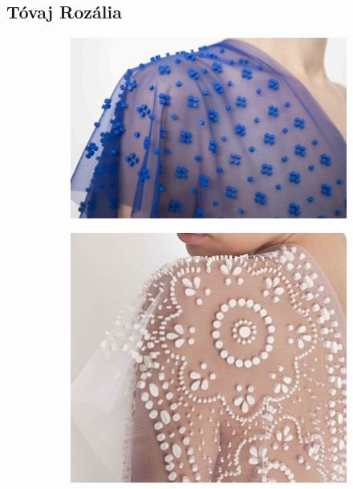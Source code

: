 \documentclass[fontsize=12pt, appendixprefix=true]{scrreprt}
\begin{document}
\subsection{Tóvaj Rozália}

\begin{figure}[ht!]
	\centering
	\begin{subfigure}[b]{0.3\linewidth}
	  \includegraphics[width=\linewidth]{img/tr_01.png}
	  \caption{}
	\end{subfigure}
	\begin{subfigure}[b]{0.22\linewidth}
	  \includegraphics[width=\linewidth]{img/tr_02.png}
	  \caption{}
	\end{subfigure}

\end{figure}
\end{document}
